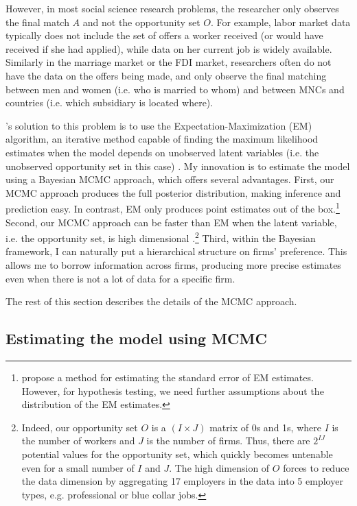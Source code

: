 However, in most social science research problems, the researcher only observes
the final match $A$ and not the opportunity set $O$. For example, labor market
data typically does not include the set of offers a worker received (or would
have received if she had applied), while data on her current job is widely
available. Similarly in the marriage market or the FDI market, researchers often
do not have the data on the offers being made, and only observe the final
matching between men and women (i.e. who is married to whom) and between MNCs
and countries (i.e. which subsidiary is located where).

\citet{Logan1998}'s solution to this problem is to use the
Expectation-Maximization (EM) algorithm, an iterative method capable of finding
the maximum likelihood estimates when the model depends on unobserved latent
variables (i.e. the unobserved opportunity set in this case)
\citep{Dempster1977}. My innovation is to estimate the model using a Bayesian
MCMC approach, which offers several advantages. First, our MCMC approach
produces the full posterior distribution, making inference and prediction easy.
In contrast, EM only produces point estimates out of the
box.\footnote{\citet{Jamshidian2000} propose a method for estimating the
  standard error of EM estimates. However, for hypothesis testing, we need
  further assumptions about the distribution of the EM estimates.} Second, our
MCMC approach can be faster than EM when the latent variable, i.e. the
opportunity set, is high dimensional \citep{Ryden2008}.\footnote{Indeed, our
  opportunity set $O$ is a $(I \times J)$ matrix of 0s and 1s, where $I$ is the
  number of workers and $J$ is the number of firms. Thus, there are $2^{IJ}$
  potential values for the opportunity set, which quickly becomes untenable even
  for a small number of $I$ and $J$. The high dimension of $O$ forces
  \citet{Logan1998} to reduce the data dimension by aggregating 17 employers in
  the data into 5 employer types, e.g. professional or blue collar jobs.} Third,
within the Bayesian framework, I can naturally put a hierarchical structure on
firms' preference. This allows me to borrow information across firms, producing
more precise estimates even when there is not a lot of data for a specific firm.

The rest of this section describes the details of the MCMC approach.

\subsection{Estimating the model using MCMC}

